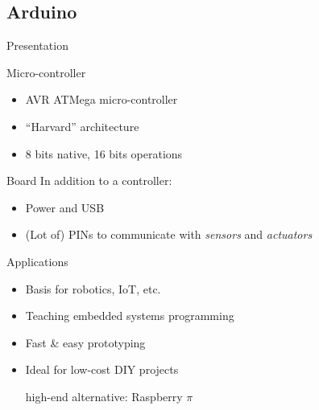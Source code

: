 


\begin{reveals}
		
\maketitle


\section{Arduino}

\begin{frame}[c]{Presentation}
  
  \begin{block}{Micro-controller}
    \begin{itemize}
    \item AVR ATMega micro-controller
    \item ``Harvard'' architecture
    \item 8 bits native, 16 bits operations
    \end{itemize}
  \end{block}

  \vfill

  \begin{block}{Board}
    In addition to a controller:
    \begin{itemize}
    \item Power and USB
    \item (Lot of) PINs to communicate with \emph{sensors} and
      \emph{actuators}
    \end{itemize}
  \end{block}
  \vfill

  \begin{block}{Applications}
    \begin{itemize}
    \item Basis for robotics, IoT, etc.
    \item Teaching embedded systems programming
    \item Fast \& easy prototyping
    \item Ideal for low-cost DIY projects
      \begin{center}
        \color{red}high-end alternative: Raspberry \(\pi\)
      \end{center}
    \end{itemize}
  \end{block}


\end{frame}
\end{reveals}
